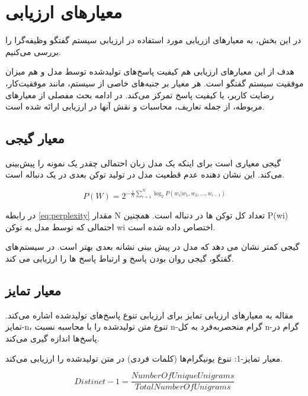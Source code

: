 \section{معیارهای ارزیابی}
در این بخش، به معیارهای ازریابی مورد استفاده در ارزیابی سیستم گفتگو وظیفه‌گرا را بررسی می‌کنیم.

هدف از این معیارهای ارزیابی هم کیفیت پاسخ‌های تولید‌شده توسط مدل و هم میزان موفقیت سیستم گفتگو است. هر معیار بر جنبه‌های خاصی از سیستم، مانند موفقیت‌کار، رضایت کاربر، یا کیفیت پاسخ تمرکز می‌کند. در ادامه بحث مفصلی از معیارهای مربوطه، از جمله تعاریف، محاسبات و نقش آنها در ارزیابی ارائه شده است.

\subsection[معیار گیجی]{معیار گیجی}

گیجی معیاری است برای اینکه یک مدل زبان احتمالی چقدر یک نمونه را پیش‌بینی می‌کند. این نشان دهنده عدم قطعیت مدل در تولید توکن بعدی در یک دنباله است.

\begin{equation}
\label{eq:perplexity}
P(W) = 2^{-\frac{1}{N} \sum_{i=1}^{N} \log_2 P(w_i | w_1, w_2, \ldots, w_{i-1})}
\end{equation}

در رابطه
\ref{eq:perplexity}
مقدار N  تعداد کل توکن ها در دنباله است.
همچنین P(wi) احتمالی که توسط مدل به توکن wi اختصاص داده شده است.


 گیجی کمتر نشان می دهد که مدل در پیش بینی نشانه بعدی بهتر است. در سیستم های گفتگو، گیجی روان بودن پاسخ و ارتباط پاسخ ها را ارزیابی می کند.

\subsection[معیار تمایز]{معیار تمایز}

مقاله%
\cite{li2015diversity}
به معیارهای ارزیابی تمایز برای ارزیابی تنوع پاسخ‌های تولید‌شده اشاره می‌کند. تمایز-n، تنوع متن تولیدشده را با محاسبه نسبت n-گرام منحصر‌به‌فرد به کل n-گرام در پاسخ‌ها اندازه گیری می‌کند.


معیار تمایز-1: تنوع یونیگرام‌ها (کلمات فردی) در متن تولیدشده را ارزیابی می‌کند.
\begin{LTR}
\begin{equation}
Distinct-1 = \frac{NumberOfUniqueUnigrams}{TotalNumberOfUnigrams}
\end{equation}
\end{LTR}

